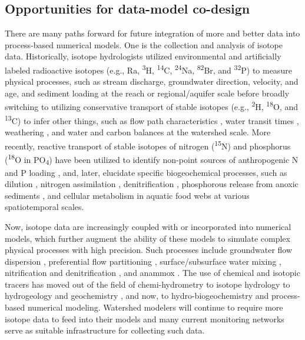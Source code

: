 \documentclass[preprint,review, 12pt]{elsarticle}
\begin{document}
\subsection{Opportunities for data-model co-design}
There are many paths forward for future integration of more and better data into process-based numerical models. One is the collection and analysis of isotope data. Historically, isotope hydrologists utilized environmental and artificially labeled radioactive isotopes (e.g., Ra, \textsuperscript{3}H, \textsuperscript{14}C, \textsuperscript{24}Na, \textsuperscript{82}Br, and \textsuperscript{32}P) to measure physical processes, such as stream discharge, groundwater direction, velocity, and age, and sediment loading at the reach or regional/aquifer scale \citep{Joly1922, Agency1963, Agency1967} before broadly switching to utilizing conservative transport of stable isotopes (e.g., \textsuperscript{2}H, \textsuperscript{18}O, and \textsuperscript{13}C) to infer other things, such as flow path characteristics \citep{Klaus2013}, water transit times \citep{McGuire2006}, weathering \citep{Schulte2011}, and water \citep{Agency} and carbon \citep{Dawson2011} balances at the watershed scale. More recently, reactive transport of stable isotopes of nitrogen (\textsuperscript{15}N) and phosphorus (\textsuperscript{18}O in PO\textsubscript{4}) have been utilized to identify non-point sources of anthropogenic N \citep{Fry1999, Lake2001, Spoelstra2001, Robinson2001, Mayer2002, M.JakeVanderZanden2005, Kendall2008, Savard2010, Nestler2011, Kaushal2011} and P loading \citep{McLaughlin2006, Elsbury2009, Paytan2012, Granger2017, Tonderski2017, Ishida2019}, and, later, elucidate specific biogeochemical processes, such as dilution \citep{Archana2018}, nitrogen assimilation \citep{Deutsch2009, Nikolenko2018}, denitrification \citep{Wexler2014}, phosphorous release from anoxic sediments \citep{Elsbury2009}, and cellular metabolism in aquatic food webs \citep{Davies2014} at various spatiotemporal scales.
            
Now, isotope data are increasingly coupled with or incorporated into numerical models, which further augment the ability of these models to simulate complex physical processes with high precision. Such processes include groundwater flow dispersion \citep{Cornaton2011, Jiang2019}, preferential flow partitioning \citep{VanderHoven2002, Dusek2018}, surface/subsurface water mixing \citep{Turner2006}, nitrification and denitrification \citep{Choi2003, Chen2004, Rutting2007}, and anammox \citep{Granger2016}. The use of chemical and isotopic tracers has moved out of the field of chemi-hydrometry \citep{Groat1915} to isotope hydrology \citep{Agency} to hydrogeology and geochemistry \citep{Agency1974}, and now, to hydro-biogeochemistry and process-based numerical modeling.  Watershed modelers will continue to require more isotope data to feed into their models and many current monitoring networks serve as suitable infrastructure for collecting such data. 
\end{document}
